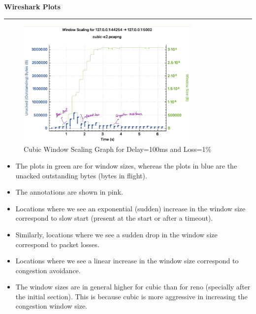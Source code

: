 \documentclass[a4paper,12pt]{article}
\newenvironment{solution}[2][]{%
    \begin{mdframed}[linecolor=blue!70!black, linewidth=2pt, roundcorner=10pt, backgroundcolor=yellow!10!white, skipabove=12pt, skipbelow=12pt]%
        \textbf{\large #2}
        \par\noindent\rule{\textwidth}{0.4pt}
}{
    \end{mdframed}
}
\begin{document}
\begin{solution}{Wireshark Plots}
    \begin{figure}[H]
        \centering
        \includegraphics[width=0.8\textwidth]{cubic-e2.png}
        \caption{Cubic Window Scaling Graph for Delay=100ms and Loss=1\%}
    \end{figure}


    \begin{itemize}
        \item The plots in green are for window sizes, whereas the plots in blue are the unacked outstanding bytes (bytes in flight). 
        \item The annotations are shown in pink. 
        \item Locations where we see an exponential (sudden) increase in the window size correspond to slow start (present at the start or after a timeout).
        \item Similarly, locations where we see a sudden drop in the window size correspond to packet losses.
        \item Locations where we see a linear increase in the window size correspond to congestion avoidance.
        \item The window sizes are in general higher for cubic than for reno (specially after the initial section). This is because cubic is more aggressive in increasing the congestion window size.
    \end{itemize}
\end{solution}
\end{document}

